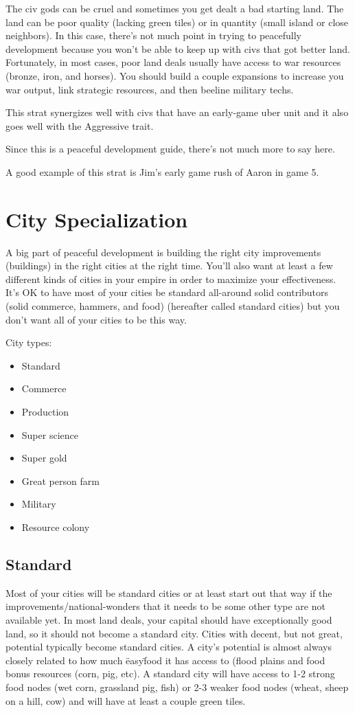 \documentclass[10pt]{article}
\begin{document}
The civ gods can be cruel and sometimes you get dealt a bad starting
land. The land can be poor quality (lacking green tiles) or in
quantity (small island or close neighbors). In this case, there's not
much point in trying to peacefully development because you won't be
able to keep up with civs that got better land. Fortunately, in most
cases, poor land deals usually have access to war resources (bronze,
iron, and horses). You should build a couple expansions to increase
you war output, link strategic resources, and then beeline military
techs.

This strat synergizes well with civs that have an early-game uber unit
and it also goes well with the Aggressive trait.

Since this is a peaceful development guide, there's not much more to say here.

A good example of this strat is Jim's early game rush of Aaron in game 5.

\section*{City Specialization}

A big part of peaceful development is building the right city improvements (buildings)
in the right cities at the right time. You'll also want at least a few different
kinds of cities in your empire in order to maximize your effectiveness. It's OK
to have most of your cities be standard all-around solid contributors (solid commerce,
hammers, and food) (hereafter called standard cities) but you don't want all of
your cities to be this way.

City types:
\begin{itemize}
\item Standard
\item Commerce
\item Production
\item Super science
\item Super gold
\item Great person farm
\item Military
\item Resource colony
\end{itemize}

\subsection*{Standard}

Most of your cities will be standard cities or at least start out that
way if the improvements/national-wonders that it needs to be some other type
are not available yet. In most land deals, your capital should have exceptionally
good land, so it should not become a standard city. Cities with decent, but not
great, potential typically become standard cities. A city's potential is almost
always closely related to how much \"easy\" food it has access to (flood plains
and food bonus resources (corn, pig, etc). A standard city will have access to
1-2 strong food nodes (wet corn, grassland pig, fish) or 2-3 weaker food nodes
(wheat, sheep on a hill, cow) and will have at least a couple green tiles.
\end{document}

